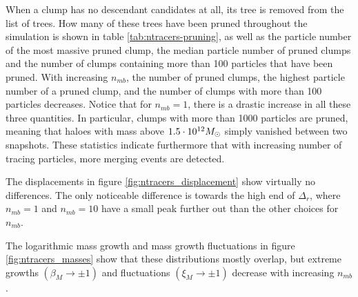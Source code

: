 When a clump has no descendant candidates at all, its tree is removed from the list of trees.
How many of these trees have been pruned throughout the simulation is shown in table \ref{tab:ntracers-pruning}, as well as the particle number of the most massive pruned clump, the median particle number of pruned clumps and the number of clumps containing more than 100 particles that have been pruned.
With increasing $n_{mb}$, the number of pruned clumps, the highest particle number of a pruned clump, and the number of clumps with more than 100 particles decreases.
Notice that for $n_{mb}=1$, there is a drastic increase in all these three quantities.
In particular, clumps with more than 1000 particles are pruned, meaning that haloes with mass above $1.5\cdot 10^{12} M_\odot$ simply vanished between two snapshots.
These statistics indicate furthermore that with increasing number of tracing particles, more merging events are detected.









The displacements in figure \ref{fig:ntracers_displacement} show virtually no differences.
The only noticeable difference is towards the high end of $\Delta_r$, where $n_{mb}=1$ and $n_{mb}=10$ have a small peak further out than the other choices for $n_{mb}$.










The logarithmic mass growth and mass growth fluctuations in figure \ref{fig:ntracers_masses} show that these distributions mostly overlap, but extreme growths $(\beta_M \rightarrow \pm 1)$ and fluctuations $(\xi_M \rightarrow \pm 1)$ decrease with increasing $n_{mb}$.






